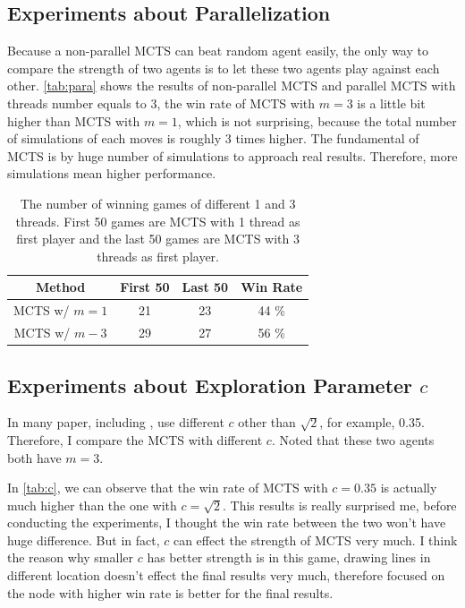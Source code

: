 \documentclass[twocolumn]{extarticle}
\begin{document}
\subsection{Experiments about Parallelization}

Because a non-parallel MCTS can beat random agent easily, the only way to compare the strength of two agents is to let these two agents play against each other. \autoref{tab:para} shows the results of non-parallel MCTS and parallel MCTS with threads number equals to 3, the win rate of MCTS with $m=3$ is a little bit higher than MCTS with $m=1$, which is not surprising, because the total number of simulations of each moves is roughly 3 times higher. The fundamental of MCTS is by huge number of simulations to approach real results. Therefore, more simulations mean higher performance.

\begin{table}[H]
\centering
\caption{The number of winning games of different 1 and 3 threads. First 50 games are MCTS with 1 thread as first player and the last 50 games are MCTS with 3 threads as first player.}
\label{tab:para}
\begin{tabular}{@{}cccc@{}}
\toprule
\textbf{Method}   & \textbf{First 50} & \textbf{Last 50} & \textbf{Win Rate} \\ \midrule
MCTS w/ $m=1$ & 21                & 23               & 44 \%\\
MCTS w/ $m-3$            & 29                 & 27                & 56 \% \\ \bottomrule
\end{tabular}
\end{table}



\subsection{Experiments about Exploration Parameter $c$}

In many paper, including \cite{10.1007/978-3-540-87608-3_6}, use different $c$ other than $\sqrt{2}$, for example, 0.35. Therefore, I compare the MCTS with different $c$. Noted that these two agents both have $m=3$. 

In \autoref{tab:c}, we can observe that the win rate of MCTS with $c=0.35$ is actually much higher than the one with $c=\sqrt{2}$. This results is really surprised me, before conducting the experiments, I thought the win rate between the two won't have huge difference. But in fact, $c$ can effect the strength of MCTS very much. I think the reason why smaller $c$ has better strength is in this game, drawing lines in different location doesn't effect the final results very much, therefore focused on the node with higher win rate is better for the final results.
\end{document}
